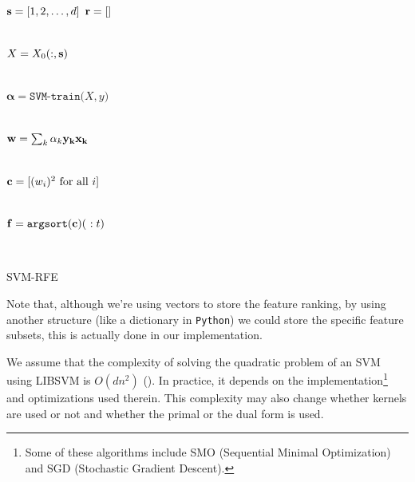 \begin{algorithm}[h]
    \DontPrintSemicolon
      $\mathbf{s} = [1,2, \dotsc, d]$ 
      $\mathbf{r} = []$  
        {
            \\
            $X=X_0(:,\mathbf{s})$\VS

            \\
            $\boldsymbol{\alpha} = \texttt{SVM-train(} X, y \texttt{)}$\VS

            \\
            $\mathbf{w} = \sum_k{\alpha_k \mathbf{y_k} \mathbf{x_k}}$\VS

            \\
            $\mathbf{c} = [(w_i)^2 \text{ for all $i$}]$\VS

            \\
            $\vt{f} = \texttt{argsort}(\vt{c})(\ :t)$\VS

            \\
        }
    \caption{SVM-RFE}
    \label{alg:rfe1}
\end{algorithm}

Note that, although we're using vectors to store the feature ranking, by using another structure (like a dictionary in \texttt{Python}) we could store the specific feature subsets, this is actually done in our implementation. 

We assume that the complexity of solving the quadratic problem of an SVM using LIBSVM is $O(dn^2)$ (\cite{abdiansah_time_2015}). In practice, it depends on the im\-ple\-men\-ta\-tion\footnote{Some of these algorithms include SMO (Sequential Minimal Optimization) and SGD (Stochastic Gradient Descent).} and optimizations used therein. This complexity may also change whether kernels are used or not and whether the primal or the dual form is used. 

